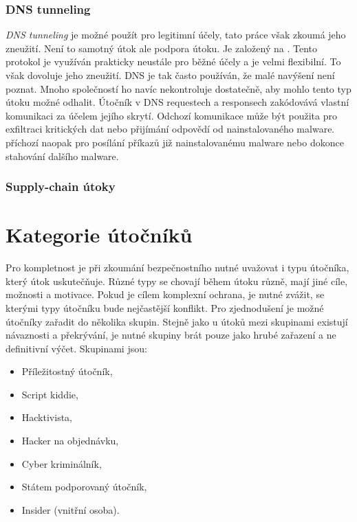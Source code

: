 \subsubsection{DNS tunneling}
\textit{DNS tunneling} je možné použít pro legitimní účely, tato práce však zkoumá jeho zneužití.
Není to samotný útok ale podpora útoku.
Je založený na .
Tento protokol je využíván prakticky neustále pro běžné účely a je velmi flexibilní.
To však dovoluje jeho zneužití.
\ac{DNS} je tak často používán, že malé navýšení není poznat.
Mnoho společností ho navíc nekontroluje dostatečně, aby mohlo tento typ útoku možné odhalit.
Útočník v \ac{DNS} requestech a responsech zakódovává vlastní komunikaci za účelem jejího skrytí.
Odchozí komunikace může být použita pro exfiltraci kritických dat nebo přijímání odpovědí od nainstalovaného malware.
příchozí naopak pro posílání příkazů již nainstalovanému malware nebo dokonce stahování dalšího malware.\cite{cisco_most_common_attack, bright_sec_dns_tunneling}

\subsubsection{Supply-chain útoky}

\section{Kategorie útočníků}
Pro kompletnost je při zkoumání bezpečnostního nutné uvažovat i typu útočníka, který útok uskutečňuje.
Různé typy se chovají během útoku různě, mají jiné cíle, možnosti a motivace.
Pokud je cílem komplexní ochrana, je nutné zvážit, se kterými typy útočníku bude nejčastější konflikt.
Pro zjednodušení je možné útočníky zařadit do několika skupin.
Stejně jako u útoků mezi skupinami existují návaznosti a překrývání, je nutné skupiny brát pouze jako hrubé zařazení a ne definitivní výčet.
Skupinami jsou:
\begin{itemize}
	\item Příležitostný útočník,
	\item Script kiddie,
	\item Hacktivista,
	\item Hacker na objednávku,
	\item Cyber kriminálník,
	\item Státem podporovaný útočník,
	\item Insider (vnitřní osoba).
\end{itemize}\cite{Enisa_thread_landscape,data_flair_attackers}

